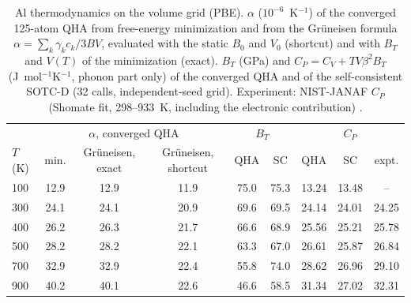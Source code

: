 \begin{table}[t]
\caption{Al thermodynamics on the volume grid (PBE). $\alpha$ ($10^{-6}$~K$^{-1}$) of the converged 125-atom QHA from free-energy minimization and from the Gr\"uneisen formula $\alpha=\sum_k\gamma_kc_k/3BV$, evaluated with the static $B_0$ and $V_0$ (shortcut) and with $B_T$ and $V(T)$ of the minimization (exact). $B_T$ (GPa) and $C_P=C_V+TV\beta^2B_T$ (J~mol$^{-1}$K$^{-1}$, phonon part only) of the converged QHA and of the self-consistent SOTC-D (32 calls, independent-seed grid). Experiment: NIST-JANAF $C_P$ (Shomate fit, 298--933~K, including the electronic contribution) \cite{chase1998}.}
\label{tab:qha_thermo}
\begin{ruledtabular}
\begin{tabular}{lcccccccc}
 & \multicolumn{3}{c}{$\alpha$, converged QHA} & \multicolumn{2}{c}{$B_T$} & \multicolumn{3}{c}{$C_P$}\\
$T$ (K) & min. & Gr\"uneisen, exact & Gr\"uneisen, shortcut & QHA & SC & QHA & SC & expt.\\
\hline
100 & 12.9 & 12.9 & 11.9 & 75.0 & 75.3 & 13.24 & 13.48 & --\\
300 & 24.1 & 24.1 & 20.9 & 69.6 & 69.5 & 24.14 & 24.01 & 24.25\\
400 & 26.2 & 26.3 & 21.7 & 66.6 & 68.9 & 25.56 & 25.21 & 25.78\\
500 & 28.2 & 28.2 & 22.1 & 63.3 & 67.0 & 26.61 & 25.87 & 26.84\\
700 & 32.9 & 32.9 & 22.4 & 55.8 & 74.0 & 28.62 & 26.96 & 29.10\\
900 & 40.2 & 40.1 & 22.6 & 46.6 & 58.5 & 31.34 & 27.02 & 32.31\\
\end{tabular}
\end{ruledtabular}
\end{table}
